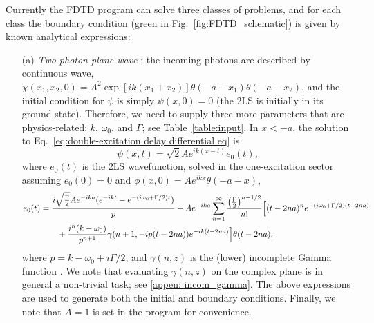 \documentclass[final,1p,times]{elsarticle}
\begin{document}
Currently the FDTD program can solve three classes of problems, and for each class the boundary condition (green in Fig.~\ref{fig:FDTD_schematic}) is given by known analytical expressions:
\begin{enumerate}
	\item[(a)] \textit{Two-photon plane wave} \cite{FangNJP18}: the incoming photons are described by continuous wave, $\chi(x_1, x_2, 0) = A^2 \exp[i k (x_1+x_2)]\theta(-a-x_1)\theta(-a-x_2)$, and the initial condition for $\psi$ is simply $\psi(x,0)=0$ (the 2LS is initially in its ground state). Therefore, we need to supply three more parameters that are physics-related: $k$, $\omega_0$, and $\Gamma$; see Table~\ref{table:input}. %
	In $x<-a$, the solution to Eq.~\eqref{eq:double-excitation delay differential eq} is 
	\begin{equation}
	\psi(x,t) = \sqrt{2}Ae^{ik(x-t)}e_0(t), 
	\label{eq: BC two-photon scattering}
	\end{equation}
	where $e_0(t)$ is the 2LS wavefunction, solved in the one-excitation sector assuming $e_0(0)=0$ and $\phi(x, 0)=A e^{ikx}\theta(-a-x)$,
	\begin{equation}
	\begin{aligned}
	e_0(t)&=\frac{i\sqrt{\frac{\Gamma}{2}} Ae^{-ika}(e^{-ikt}-e^{-(i\omega_0+\Gamma/2)t})}{p}
    - Ae^{-ika} \sum_{n=1}^{\infty}\frac{\left(\frac{\Gamma}{2}\right)^{n-1/2}}{n!}
	\Bigl[(t-2na)^n e^{-(i\omega_0+\Gamma/2)(t-2na)}\\
	&\quad\quad+\frac{i^n(k-\omega_0)}{p^{n+1}}\gamma(n+1,-ip(t-2na))e^{-ik(t-2na)}
	\Bigr]\theta(t-2na),
	\end{aligned}\label{eq:exact solution single-photon scattering}
	\end{equation}
	where $p=k-\omega_0+i\Gamma/2$, and $\gamma(n, z)$ is the (lower) incomplete Gamma function \cite{NISThandbook}. We note that evaluating $\gamma(n, z)$ on the complex plane is in general a non-trivial task; see \ref{appen: incom_gamma}.
	The above expressions are used to generate both the initial and boundary conditions. Finally, we note that $A=1$ is set in the program for convenience.
	

\end{enumerate}
\end{document}
